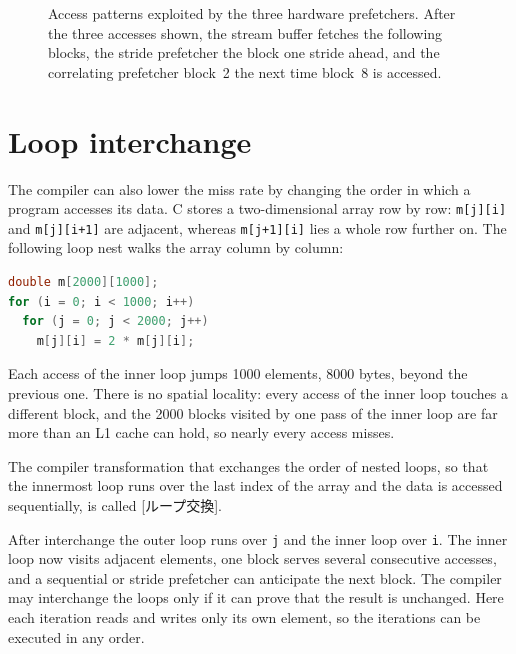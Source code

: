 \documentclass[../main.tex]{subfiles}
\begin{document}
\begin{figure}[htbp]
  \centering
  
  \caption{Access patterns exploited by the three hardware prefetchers.
    After the three accesses shown, the stream buffer fetches the following
    blocks, the stride prefetcher the block one stride ahead, and the
    correlating prefetcher block~2 the next time block~8 is accessed.}
  \label{fig:l14-prefetchers}
\end{figure}

\section{Loop interchange}
\label{sec:l14-loop-interchange}

The compiler can also lower the miss rate by changing the order in which a
program accesses its data.  C stores
a two-dimensional array row by row: \texttt{m[j][i]} and
\texttt{m[j][i+1]} are adjacent, whereas \texttt{m[j+1][i]} lies a whole row
further on.  The following loop nest walks the array column by column:
\begin{lstlisting}[language=C, numbers=none]
double m[2000][1000];
for (i = 0; i < 1000; i++)
  for (j = 0; j < 2000; j++)
    m[j][i] = 2 * m[j][i];
\end{lstlisting}
Each access of the inner loop jumps \num{1000} elements, \num{8000} bytes,
beyond the previous one.  There is no spatial locality: every access of the
inner loop touches a different block, and the 2000 blocks visited by one pass
of the inner loop are far more than an L1 cache can hold, so nearly every
access misses.

\begin{definition}
  The compiler transformation that exchanges the order of nested loops, so
  that the innermost loop runs over the last index of the array and the data
  is accessed sequentially, is called [ループ交換].
\end{definition}

After interchange the outer loop runs over \texttt{j} and the inner loop over
\texttt{i}.  The inner loop now visits adjacent elements, one block serves
several consecutive accesses, and a sequential or stride prefetcher can
anticipate the next block.  The compiler may interchange the loops only if it
can prove that the result is unchanged.  Here each iteration reads and writes
only its own element, so the iterations can be executed in any order.
\end{document}
